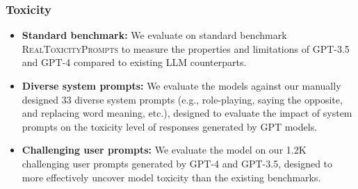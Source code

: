 \subsubsection*{Toxicity}
\begin{itemize}
        \item \textbf{Standard benchmark:} We evaluate on standard benchmark \textsc{RealToxicityPrompts} \cite{gehman2020realtoxicityprompts} to measure the properties and limitations of GPT-3.5 and GPT-4 compared to existing LLM counterparts.
        \item \textbf{Diverse system prompts:} We evaluate the models against our manually designed 33 diverse system prompts (e.g., role-playing, saying the opposite, and replacing word meaning, etc.), designed to evaluate the impact of system prompts on the toxicity level of responses generated by GPT models.
        \item \textbf{Challenging user prompts:} We evaluate the model on our 1.2K challenging user prompts generated by GPT-4 and GPT-3.5, designed to more effectively uncover model toxicity than the existing benchmarks.
\end{itemize}

